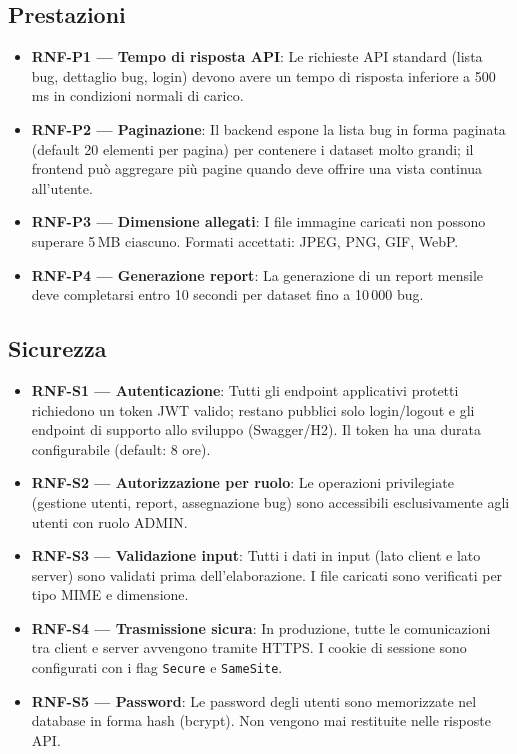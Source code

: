 ﻿\documentclass[a4paper,11pt]{article}
\begin{document}
\subsection{Prestazioni}
\begin{itemize}
  \item \textbf{RNF-P1 --- Tempo di risposta API}: Le richieste API standard (lista bug, dettaglio bug, login) devono avere un tempo di risposta inferiore a 500\,ms in condizioni normali di carico.
  \item \textbf{RNF-P2 --- Paginazione}: Il backend espone la lista bug in forma paginata (default 20 elementi per pagina) per contenere i dataset molto grandi; il frontend pu\`o aggregare pi\`u pagine quando deve offrire una vista continua all'utente.
  \item \textbf{RNF-P3 --- Dimensione allegati}: I file immagine caricati non possono superare 5\,MB ciascuno. Formati accettati: JPEG, PNG, GIF, WebP.
  \item \textbf{RNF-P4 --- Generazione report}: La generazione di un report mensile deve completarsi entro 10 secondi per dataset fino a 10\,000 bug.
\end{itemize}

\subsection{Sicurezza}
\begin{itemize}
  \item \textbf{RNF-S1 --- Autenticazione}: Tutti gli endpoint applicativi protetti richiedono un token JWT valido; restano pubblici solo login/logout e gli endpoint di supporto allo sviluppo (Swagger/H2). Il token ha una durata configurabile (default: 8 ore).
  \item \textbf{RNF-S2 --- Autorizzazione per ruolo}: Le operazioni privilegiate (gestione utenti, report, assegnazione bug) sono accessibili esclusivamente agli utenti con ruolo ADMIN.
  \item \textbf{RNF-S3 --- Validazione input}: Tutti i dati in input (lato client e lato server) sono validati prima dell'elaborazione. I file caricati sono verificati per tipo MIME e dimensione.
  \item \textbf{RNF-S4 --- Trasmissione sicura}: In produzione, tutte le comunicazioni tra client e server avvengono tramite HTTPS. I cookie di sessione sono configurati con i flag \texttt{Secure} e \texttt{SameSite}.
  \item \textbf{RNF-S5 --- Password}: Le password degli utenti sono memorizzate nel database in forma hash (bcrypt). Non vengono mai restituite nelle risposte API.
\end{itemize}
\end{document}
